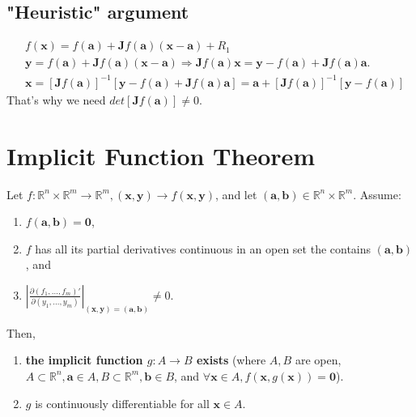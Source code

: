 \subsection{"Heuristic" argument}
\begin{align*}
     & f(\mathbf{x}) = f(\mathbf{a}) + \mathbf{J}f(\mathbf{a})(\mathbf{x} - \mathbf{a}) + R_1                                                                                                            \\
     & \mathbf{y} = f(\mathbf{a}) + \mathbf{J}f(\mathbf{a})(\mathbf{x} - \mathbf{a}) \Longrightarrow \mathbf{J}f(\mathbf{a})\mathbf{x} = \mathbf{y} - f(\mathbf{a}) + \mathbf{J}f(\mathbf{a})\mathbf{a}. \\
     & \mathbf{x} = [\mathbf{J}f(\mathbf{a})]^{-1}[\mathbf{y} - f(\mathbf{a})+\mathbf{J}f(\mathbf{a})\mathbf{a}] = \mathbf{a} + [\mathbf{J}f(\mathbf{a})]^{-1}[\mathbf{y}-f(\mathbf{a})]
\end{align*}
That's why we need $det[\mathbf{J}f(\mathbf{a})] \neq 0$.



\section{Implicit Function Theorem}

\begin{theorem}
    Let $f: \mathbb{R}^{n} \times \mathbb{R}^{m} \to \mathbb{R}^{m}, (\mathbf{x}, \mathbf{y}) \to f(\mathbf{x}, \mathbf{y})$, and let $(\mathbf{a}, \mathbf{b}) \in \mathbb{R}^{n} \times \mathbb{R}^{m}$. Assume:
    \begin{enumerate}
        \item $f(\mathbf{a}, \mathbf{b}) = \mathbf{0}$,
        \item $f$ has all its partial derivatives continuous in an open set the contains $(\mathbf{a}, \mathbf{b})$, and
        \item $\left|\frac{\partial (f_1,\dots,f_m)'}{\partial (y_1,\dots,y_m)}\right|_{(\mathbf{x,y}) = (\mathbf{a,b})} \neq 0$.
    \end{enumerate}
    Then, \begin{enumerate}
        \item \textbf{the implicit function $g: A \to B$ exists} (where $A,B$ are open, $A \subset \mathbb{R}^{n}, \mathbf{a} \in A, B \subset \mathbb{R}^{m}, \mathbf{b} \in B$, and $\forall \mathbf{x} \in A, f(\mathbf{x}, g(\mathbf{x})) = \mathbf{0}$).
        \item $g$ is continuously differentiable for all $\mathbf{x} \in A$.
    \end{enumerate}
\end{theorem}


